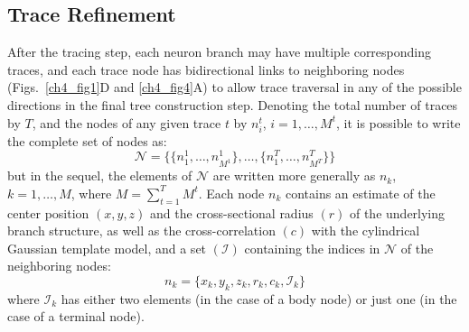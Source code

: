 \subsection{Trace Refinement}
\label{subsec:trace-refinement}
After the tracing step, each neuron branch may have multiple corresponding traces, and each trace node has bidirectional links to neighboring nodes (Figs.~\ref{ch4_fig1}D and \ref{ch4_fig4}A) to allow trace traversal in any of the possible directions in the final tree construction step. Denoting the total number of traces by $T$, and the nodes of any given trace $t$ by $n_i^t$, $i=1,\dots,M^t$, it is possible to write the complete set of nodes as:
\begin{equation}
\label{eq:N}
\mathcal{N} = \bigg\{
\Big\{ n_1^1,\dots,n_{M^1}^1\Big\},
\dots,
\Big\{ n_1^T,\dots,n_{M^T}^T\Big\}
\bigg\}
\end{equation}
but in the sequel, the elements of $\mathcal{N}$ are written more generally as $n_k$, $k=1,\dots,M$, where $M=\sum_{t=1}^{T}M^t$. Each node $n_k$ contains an estimate of the center position $\left(x,y,z\right)$ and the cross-sectional radius $\left(r\right)$ of the underlying branch structure, as well as the cross-correlation $\left(c\right)$ with the cylindrical Gaussian template model, and a set $\left( \mathcal{I} \right)$ containing the indices in $\mathcal{N}$ of the neighboring nodes:
\begin{equation}
\label{eq:n_k}
n_k = \lbrace x_k, y_k, z_k, r_k, c_k, \mathcal{I}_k \rbrace
\end{equation}
where $\mathcal{I}_k$ has either two elements (in the case of a body node) or just one (in the case of a terminal node).

